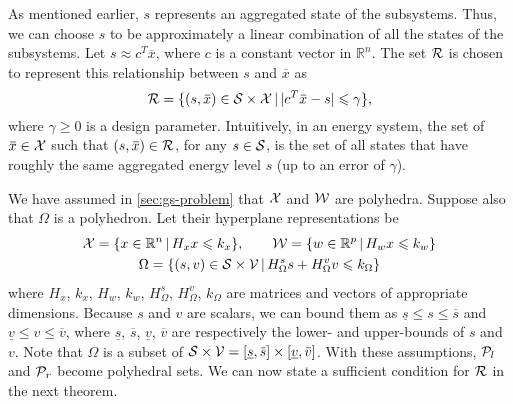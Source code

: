 As mentioned earlier, %
$s$ represents an aggregated state of the subsystems. %
Thus, we can choose $s$ to be approximately a linear combination of all the %
states of the subsystems.
Let $s \approx c^{T} \overbar{x}$, where $c$ is a constant vector in $\mathbb{R}^{n}$.
The set $\mathcal{R}$ is chosen to represent this relationship between $s$ and $\overbar{x}$ as 
\begin{equation}
  \label{eq:abstraction-gs:R}
  \RSet = \{ (s,\overbar{x}) \in \SSet \times \XSet \,|\, | c^{T} \overbar{x} - s | \leqslant \gamma \} \text,
\end{equation}
where $\gamma \geqslant 0$ is a design parameter.
Intuitively, in an energy system, the set of $\overbar{x} \in \XSet$ such that $(s,\overbar{x}) \in \RSet$, for any $s \in \mathcal{S}$, is the set of all states that have roughly the same aggregated energy level $s$ (up to an error of $\gamma$).

We have assumed in \cref{sec:gs-problem} that $\mathcal{X}$ and $\mathcal{W}$ are polyhedra.
Suppose also that $\Omega$ is a polyhedron.
Let their hyperplane representations be
\begin{gather*}
  \mathcal{X} = \{ x \in \mathbb{R}^{n} \,|\, H_{x} x \leqslant k_{x} \}, \qquad
  \mathcal{W} = \{ w \in \mathbb{R}^{p} \,|\, H_{w} x \leqslant k_{w} \}\\
  \Omega = \{ (s,v) \in \mathcal{S} \times \mathcal{V} \,|\, H_{\Omega}^{s} s + H_{\Omega}^{v} v \leqslant k_{\Omega} \}
\end{gather*}
where $H_{x}$, $k_{x}$, $H_{w}$, $k_{w}$, $H_{\Omega}^{s}$, $H_{\Omega}^{v}$, $k_{\Omega}$ are matrices and vectors of appropriate dimensions.
Because $s$ and $v$ are scalars, we can bound them as $\underline{s} \leqslant s \leqslant \overbar{s}$ and $\underline{v} \leqslant v \leqslant \overbar{v}$, where $\underline{s}$, $\overbar{s}$, $\underline{v}$, $\overbar{v}$ are respectively the lower- and upper-bounds of $s$ and $v$.
Note that $\Omega$ is a subset of $\SSet \times \VSet = [\underline{s},\overbar{s}] \times [\underline{v},\overbar{v}]$.
With these assumptions, $\mathcal{P}_{l}$ and $\mathcal{P}_{r}$ become polyhedral sets.
We can now state a sufficient condition for $\mathcal{R}$ in the next theorem.

